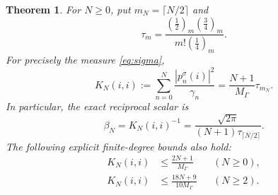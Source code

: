 \documentclass[11pt]{article}
\newtheorem{theorem}{Theorem}
\begin{document}
\begin{theorem}\label{thm:kernel}
For $N\ge0$, put $m_N=\lceil N/2\rceil$ and
\[
 \tau_m=\frac{(\tfrac12)_m(\tfrac34)_m}{m!(\tfrac14)_m}.
\]
For precisely the measure \eqref{eq:sigma},
\begin{equation}\label{eq:exactkernel}
 \boxed{K_N(i,i):=\sum_{n=0}^N\frac{|p_n^\sigma(i)|^2}{\gamma_n}
       =\frac{N+1}{M_\Gamma}\tau_{m_N}.}
\end{equation}
In particular, the exact reciprocal scalar is
\begin{equation}\label{eq:beta}
 \boxed{\beta_N=K_N(i,i)^{-1}
 =\frac{\sqrt{2\pi}}{(N+1)\tau_{\lceil N/2\rceil}}.}
\end{equation}
The following explicit finite-degree bounds also hold:
\begin{align}
 K_N(i,i)&\le\frac{2N+1}{M_\Gamma}&& (N\ge0),\label{eq:linear}\\
 K_N(i,i)&\le\frac{18N+9}{10M_\Gamma}&& (N\ge2).\label{eq:betterlinear}
\end{align}
\end{theorem}
\end{document}
